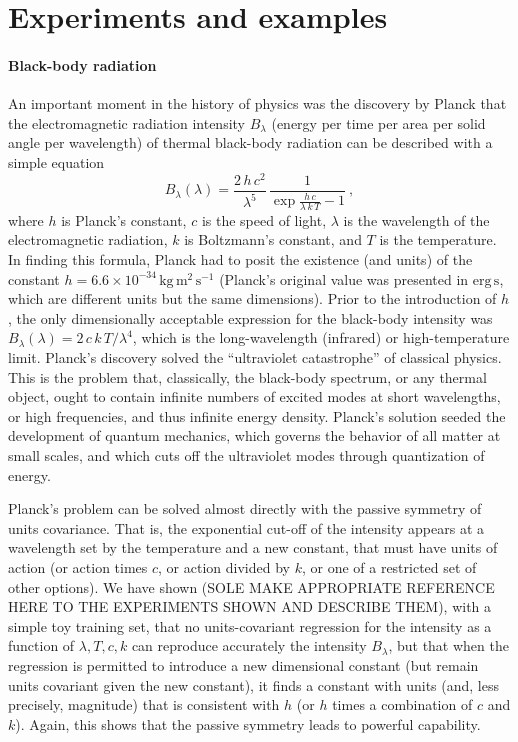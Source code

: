 \documentclass{article}
\theoremstyle{plain}
\theoremstyle{definition}
\theoremstyle{remark}
\newcommand{\unit}[1]{\mathrm{#1}}
\newcommand{\kg}{\unit{kg}}
\newcommand{\m}{\unit{m}}
\newcommand{\s}{\unit{s}}
\begin{document}
\section{Experiments and examples}\label{sec:experiments}

\paragraph{Black-body radiation}
An important moment in the history of physics was the discovery by Planck that the electromagnetic radiation intensity $B_\lambda$ (energy per time per area per solid angle per wavelength) of thermal black-body radiation can be described with a simple equation \cite{planck}
\begin{equation}
    B_\lambda(\lambda) = \frac{2\,h\,c^2}{\lambda^5}\,\frac{1}{\exp\frac{h\,c}{\lambda\,k\,T} - 1}~,
\end{equation}
where $h$ is Planck's constant,
$c$ is the speed of light,
$\lambda$ is the wavelength of the electromagnetic radiation,
$k$ is Boltzmann's constant,
and $T$ is the temperature.
In finding this formula, Planck had to posit the existence (and units) of the constant $h=6.6\times 10^{-34}\,\kg\,\m^2\,\s^{-1}$ (Planck's original value was presented in $\mathrm{erg}\,\s$, which are different units but the same dimensions).
Prior to the introduction of $h$, the only dimensionally acceptable expression for the black-body intensity was $B_\lambda(\lambda)=2\,c\,k\,T/\lambda^4$, which is the long-wavelength (infrared) or high-temperature limit.
Planck's discovery solved the ``ultraviolet catastrophe'' of classical physics.
This is the problem that, classically, the black-body spectrum, or any thermal object, ought to contain infinite numbers of excited modes at short wavelengths, or high frequencies, and thus infinite energy density.
Planck's solution seeded the development of quantum mechanics, which governs the behavior of all matter at small scales, and which cuts off the ultraviolet modes through quantization of energy.

Planck's problem can be solved almost directly with the passive symmetry of units covariance.
That is, the exponential cut-off of the intensity appears at a wavelength set by the temperature and a new constant, that must have units of action (or action times $c$, or action divided by $k$, or one of a restricted set of other options).
We have shown (SOLE MAKE APPROPRIATE REFERENCE HERE TO THE EXPERIMENTS SHOWN AND DESCRIBE THEM), with a simple toy training set, that no units-covariant regression for the intensity as a function of $\lambda, T, c, k$ can reproduce accurately the intensity $B_\lambda$, but that when the regression is permitted to introduce a new dimensional constant (but remain units covariant given the new constant), it finds a constant with units (and, less precisely, magnitude) that is consistent with $h$ (or $h$ times a combination of $c$ and $k$).
Again, this shows that the passive symmetry leads to powerful capability.
\end{document}
